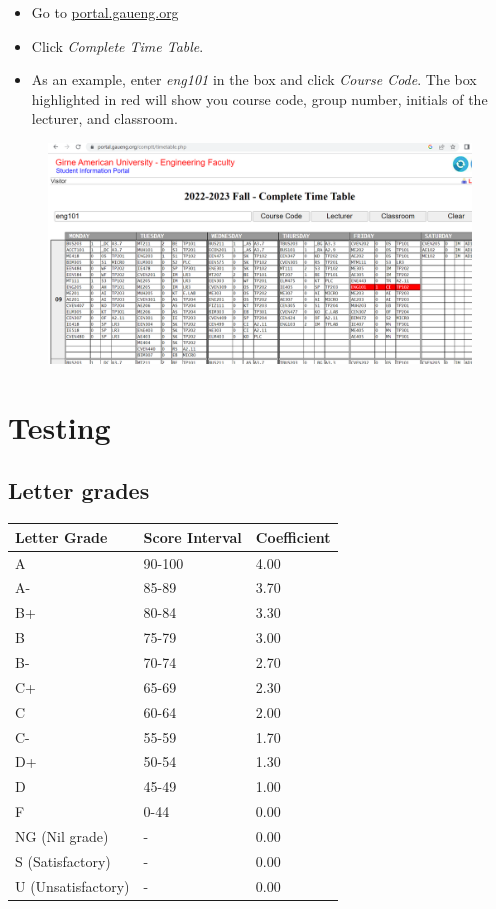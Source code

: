 \documentclass{article}
\begin{document}
\begin{itemize}
	\item Go to \url{portal.gaueng.org}
	\item Click \textit{Complete Time Table}.
	\item As an example, enter \textit{eng101} in the box and click \textit{Course Code}. The box highlighted in red will show you course code, group number, initials of the lecturer, and classroom.
\end{itemize}

\begin{figure}[H]
	\centering
	\includegraphics[width=\textwidth]{portal}
\end{figure}

\section{Testing}



\subsection{Letter grades}

\begin{table}[H]
	\centering
	\begin{tabular}{lll}
			\toprule
			Letter Grade & Score Interval & Coefficient\\
			\midrule
			A & 90-100 & 4.00\\
			A- & 85-89 & 3.70\\
			B+ & 80-84 & 3.30\\
			B & 75-79 & 3.00\\
			B- & 70-74 & 2.70\\
			C+ & 65-69 & 2.30\\
			C & 60-64 & 2.00\\
			C- & 55-59 & 1.70\\
			D+ & 50-54 & 1.30\\
			D & 45-49 & 1.00\\
			F & 0-44 & 0.00\\	
			NG (Nil grade) & - & 0.00\\	
			S (Satisfactory) & - & 0.00\\
			U (Unsatisfactory) & - & 0.00\\
			\bottomrule	
		\end{tabular}
\end{table}
\end{document}
